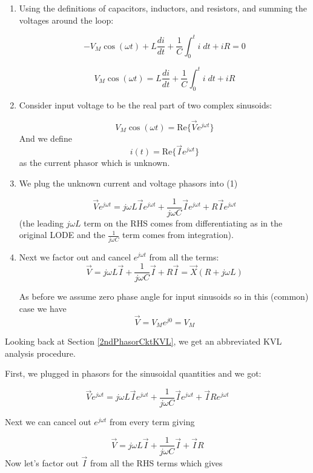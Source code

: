 \begin{enumerate}
\item Using the definitions of capacitors, inductors, and resistors, and summing the  voltages around the loop:

\[
-V_M\cos(\omega t) + L\frac{di}{dt} + \frac {1}  { C}\int_0^t i\; dt + iR = 0
\]

\[
V_M\cos(\omega t) = L\frac{di}{dt}  + \frac {1}  {C}\int_0^t i\; dt + iR
\]

\item Consider input voltage to be the real part of two complex sinusoids:

\[
V_M\cos(\omega t) = \mathrm{Re}\{ \vec{V}e^{j\omega t} \}
\]
And we define
\[
i(t) = \mathrm{Re}\{ \vec{I}e^{j\omega t}  \}
\]
as the current phasor which is
unknown.


\item We plug the unknown current and voltage phasors into (1)

\[
\vec{V}e^{j\omega t} = j\omega L\vec{I}e^{j\omega t} + \frac {1}  {j\omega C}\vec{I}e^{j\omega t} +  R\vec{I}e^{j\omega t}
\]
(the leading $j\omega L$ term on the RHS comes from differentiating as in the original LODE and the $\frac {1}  {j\omega C}$
term comes from integration).


\item Next we factor out and cancel $e^{j\omega t}$ from all the terms:
\[
\vec{V} = j\omega L\vec{I} + \frac{1}{j\omega C} \vec I + R\vec{I}  = \vec{X}(R + j\omega L)
\]

As before we assume zero phase angle for input sinusoids so in this (common) case we have
\[
\vec{V} =V_Me^{j0} = V_M
\]


\end{enumerate}




Looking back at Section \ref{2ndPhasorCktKVL}, we get an abbreviated KVL analysis procedure.

First, we plugged in phasors for the sinusoidal quantities and
we got:

\[
\vec{V}e^{j\omega t} = j\omega L\vec{I}e^{j\omega t} + \frac{1}{j\omega C}\vec{I}e^{j\omega t} + \vec{I}Re^{j\omega t}
\]

Next we can  cancel out $e^{j\omega t}$ from every term giving

\[
\vec{V}  = j\omega L\vec{I}  + \frac{1}{j\omega C}\vec{I}  + \vec{I}R
\]
Now let's factor out $\vec{I}$ from all the RHS terms which gives

